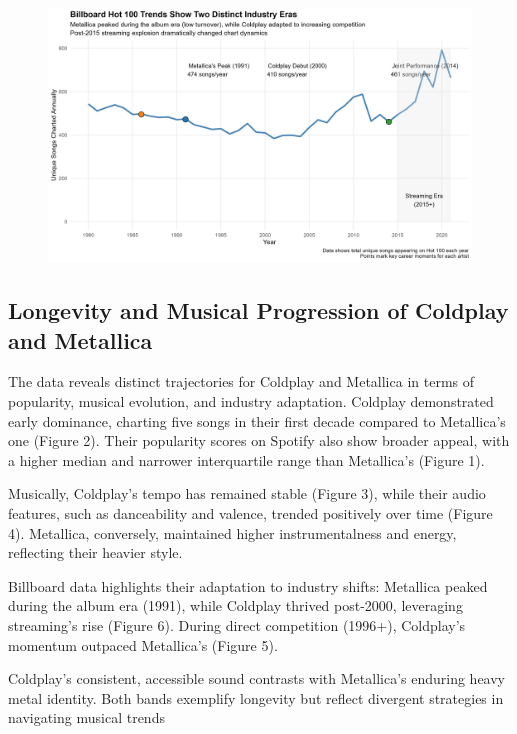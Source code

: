\documentclass[
  man,floatsintext]{apa6}
\begin{document}
\begin{figure}

{\centering \includegraphics[width=0.9\linewidth]{../Question2/Results/industrytrend} 

}

\caption{ }\label{fig:include-image-6}
\end{figure}

\subsection{Longevity and Musical Progression of Coldplay and Metallica}\label{longevity-and-musical-progression-of-coldplay-and-metallica}

The data reveals distinct trajectories for Coldplay and Metallica in terms of popularity, musical evolution, and industry adaptation. Coldplay demonstrated early dominance, charting five songs in their first decade compared to Metallica's one (Figure 2). Their popularity scores on Spotify also show broader appeal, with a higher median and narrower interquartile range than Metallica's (Figure 1).

Musically, Coldplay's tempo has remained stable (Figure 3), while their audio features, such as danceability and valence, trended positively over time (Figure 4). Metallica, conversely, maintained higher instrumentalness and energy, reflecting their heavier style.

Billboard data highlights their adaptation to industry shifts: Metallica peaked during the album era (1991), while Coldplay thrived post-2000, leveraging streaming's rise (Figure 6). During direct competition (1996+), Coldplay's momentum outpaced Metallica's (Figure 5).

Coldplay's consistent, accessible sound contrasts with Metallica's enduring heavy metal identity. Both bands exemplify longevity but reflect divergent strategies in navigating musical trends
\end{document}
